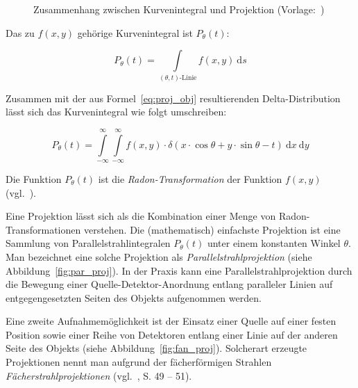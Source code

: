 \begin{figure}[!htb]
\caption{Zusammenhang zwischen Kurvenintegral und Projektion (Vorlage:~\cite{kak79})}
\label{fig:math_proj}
\end{figure}

Das zu $f(x, y)$ gehörige Kurvenintegral ist $P_{\theta}(t)$:

\begin{equation}\label{eq:proj_int}
    P_{\theta}(t) = \int\limits_{(\theta, t)\text{-Linie}} f(x, y)\ \mathrm{d}s
\end{equation}

Zusammen mit der aus Formel~\ref{eq:proj_obj} resultierenden Delta-Distribution lässt sich das Kurvenintegral wie folgt
umschreiben:

\begin{equation}\label{eq:proj_radon}
    P_{\theta}(t) = \int\limits_{-\infty}^{\infty}\int\limits_{-\infty}^{\infty}f(x, y) \cdot \delta(x \cdot
                    \cos \theta + y \cdot \sin \theta - t)\ \mathrm{d} x\ \mathrm{d} y
\end{equation}

Die Funktion $P_{\theta}(t)$ ist die \textit{Radon-Transformation} der Funktion $f(x, y)$ (vgl.~\cite{radon}).

Eine Projektion lässt sich als die Kombination einer Menge von Radon-Transformationen verstehen. Die
(mathematisch) einfachste Projektion ist eine Sammlung von Parallelstrahlintegralen $P_{\theta}(t)$ unter einem
konstanten Winkel $\theta$. Man bezeichnet eine solche Projektion als \textit{Parallelstrahlprojektion} (siehe
Abbildung~\ref{fig:par_proj}). In der Praxis kann eine Parallelstrahlprojektion durch die Bewegung einer
Quelle-Detektor-Anordnung entlang paralleler Linien auf entgegengesetzten Seiten des Objekts aufgenommen werden.

Eine zweite Aufnahmemöglichkeit ist der Einsatz einer Quelle auf einer festen Position sowie einer Reihe von Detektoren
entlang einer Linie auf der anderen Seite des Objekts (siehe Abbildung~\ref{fig:fan_proj}). Solcherart erzeugte
Projektionen nennt man aufgrund der fächerförmigen Strahlen \textit{Fächerstrahlprojektionen} (vgl.~\cite{kakslan},
S. 49 -- 51).

